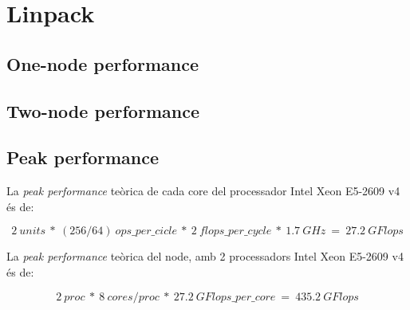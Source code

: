 \section{Linpack}
\subsection{One-node performance}





\subsection{Two-node performance}



\subsection{Peak performance}
La \textit{peak performance} teòrica de cada core del processador Intel Xeon E5-2609 v4 és de:

\[2\ units\ *\ (256/64)\ ops\_per\_cicle\ *\ 2\ flops\_per\_cycle\ *\ 1.7\ GHz\ =\ 27.2\ GFlops\]

La \textit{peak performance} teòrica del node, amb 2 processadors Intel Xeon E5-2609 v4 és de:

\[2\ proc\ *\ 8\ cores/proc\ *\ 27.2\ GFlops\_per\_core\ =\ 435.2\ GFlops\]

